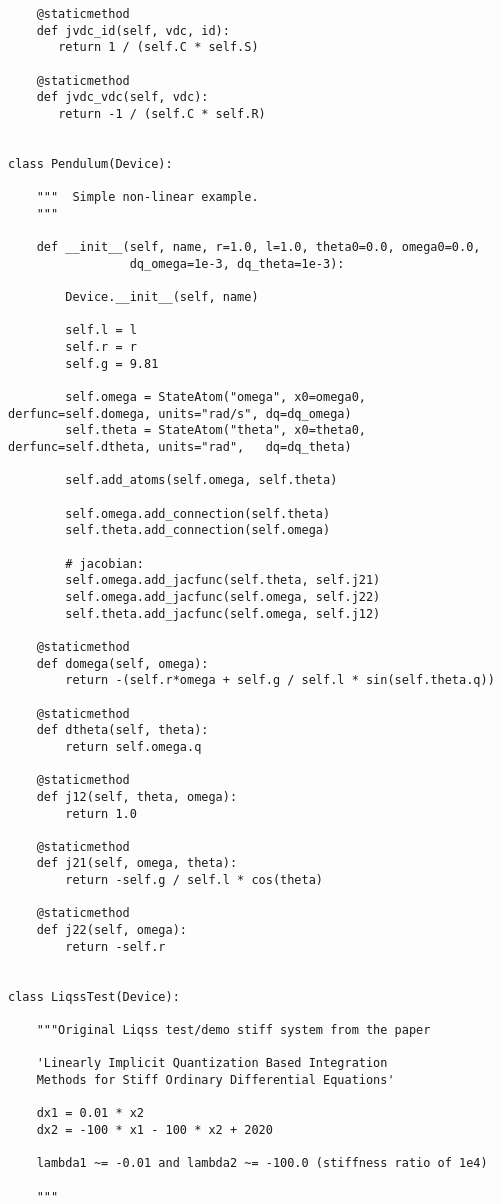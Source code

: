\begin{lstlisting}
    @staticmethod
    def jvdc_id(self, vdc, id):
       return 1 / (self.C * self.S)

    @staticmethod
    def jvdc_vdc(self, vdc):
       return -1 / (self.C * self.R)


class Pendulum(Device):

    """  Simple non-linear example.
    """

    def __init__(self, name, r=1.0, l=1.0, theta0=0.0, omega0=0.0,
                 dq_omega=1e-3, dq_theta=1e-3):

        Device.__init__(self, name)

        self.l = l
        self.r = r
        self.g = 9.81

        self.omega = StateAtom("omega", x0=omega0, derfunc=self.domega, units="rad/s", dq=dq_omega)
        self.theta = StateAtom("theta", x0=theta0, derfunc=self.dtheta, units="rad",   dq=dq_theta)

        self.add_atoms(self.omega, self.theta)

        self.omega.add_connection(self.theta)
        self.theta.add_connection(self.omega)

        # jacobian:
        self.omega.add_jacfunc(self.theta, self.j21)
        self.omega.add_jacfunc(self.omega, self.j22)
        self.theta.add_jacfunc(self.omega, self.j12)

    @staticmethod
    def domega(self, omega):
        return -(self.r*omega + self.g / self.l * sin(self.theta.q))

    @staticmethod
    def dtheta(self, theta):
        return self.omega.q

    @staticmethod
    def j12(self, theta, omega):
        return 1.0

    @staticmethod
    def j21(self, omega, theta):
        return -self.g / self.l * cos(theta)

    @staticmethod
    def j22(self, omega):
        return -self.r


class LiqssTest(Device):

    """Original Liqss test/demo stiff system from the paper

    'Linearly Implicit Quantization Based Integration
    Methods for Stiff Ordinary Differential Equations'

    dx1 = 0.01 * x2
    dx2 = -100 * x1 - 100 * x2 + 2020

    lambda1 ~= -0.01 and lambda2 ~= -100.0 (stiffness ratio of 1e4)

    """


\end{lstlisting}
